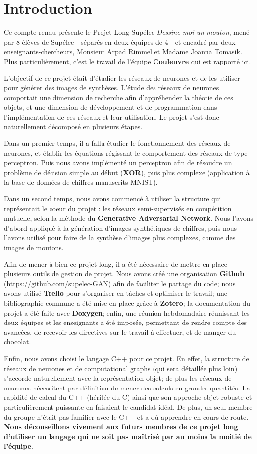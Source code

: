 \chapter*{Introduction}

Ce compte-rendu présente le Projet Long Supélec \textit{Dessine-moi un mouton}, mené par 8 élèves de Supélec - séparés en deux équipes de 4 - et encadré par deux enseignants-chercheurs, Monsieur Arpad Rimmel et Madame Joanna Tomasik. Plus particulièrement, c'est le travail de l'équipe \textbf{Couleuvre} qui est rapporté ici. 

L'objectif de ce projet était d'étudier les réseaux de neurones et de les utiliser pour générer des images de synthèses. L'étude des réseaux de neurones comportait une dimension de recherche afin d'appréhender la théorie de ces objets, et une dimension de développement et de programmation dans l'implémentation de ces réseaux et leur utilisation. Le projet s'est donc naturellement décomposé en plusieurs étapes.

Dans un premier temps, il a fallu étudier le fonctionnement des réseaux de neurones, et établir les équations régissant le comportement des réseaux de type perceptron. Puis nous avons implémenté un perceptron afin de résoudre un problème de décision simple au début (\textbf{XOR}), puis plus complexe (application à la base de données de chiffres manuscrits MNIST).

Dans un second temps, nous avons commencé à utiliser la structure qui représentait le coeur du projet : les réseaux semi-supervisés en compétition mutuelle, selon la méthode du \textbf{Generative Adversarial Network}. Nous l'avons d'abord appliqué à la génération d'images synthétiques de chiffres, puis nous l'avons utilisé pour faire de la synthèse d'images plus complexes, comme des images de moutons.

Afin de mener à bien ce projet long, il a été nécessaire de mettre en place plusieurs outils de gestion de projet. Nous avons créé une organisation \textbf{Github} (https://github.com/supelec-GAN) afin de faciliter le partage du code; nous avons utilisé \textbf{Trello} pour s'organiser en tâches et optimiser le travail; une bibliographie commune a été mise en place grâce à \textbf{Zotero}; la documentation du projet a été faite avec \textbf{Doxygen}; enfin, une réunion hebdomadaire réunissant les deux équipes et les enseignants a été imposée, permettant de rendre compte des avancées, de recevoir les directives sur le travail à effectuer, et de manger du chocolat. 

Enfin, nous avons choisi le langage C++ pour ce projet. En effet, la structure de réseaux de neurones et de computational graphs (qui sera détaillée plus loin) s'accorde naturellement avec la représentation objet; de plus les réseaux de neurones nécessitent par définition de mener des calculs en grandes quantités. La rapidité de calcul du C++ (héritée du C) ainsi que son approche objet robuste et particulièrement puissante en faisaient le candidat idéal. De plus, un seul membre du groupe n'était pas familier avec le C++ et a dû apprendre en cours de route. \textbf{Nous déconseillons vivement aux futurs membres de ce projet long d'utiliser un langage qui ne soit pas maîtrisé par au moins la moitié de l'équipe}. 
\newpage
